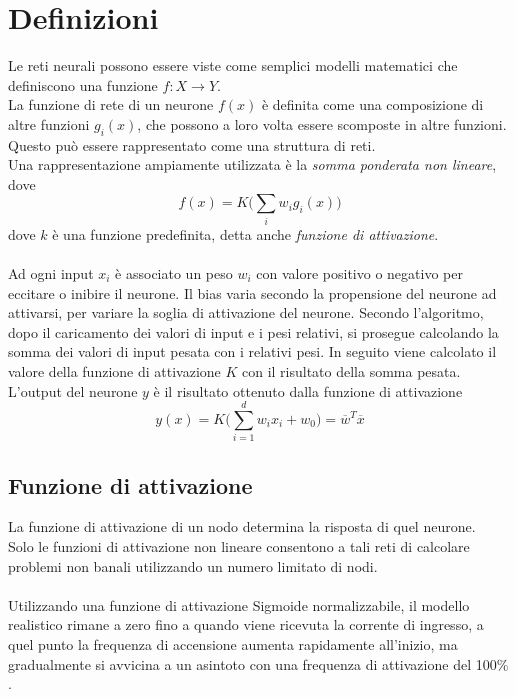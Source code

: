 \section{Definizioni}
\label{sec:def}
Le reti neurali possono essere viste come semplici modelli matematici che definiscono una funzione $f:X\rightarrow Y$. \\
La funzione di rete di un neurone $f(x)$ è definita come una composizione di altre funzioni $g_i(x)$, che possono a loro volta essere scomposte in altre funzioni. Questo può essere rappresentato come una struttura di reti.\\
Una rappresentazione ampiamente utilizzata è la \emph{somma ponderata non lineare}, dove 
\begin{equation}
f(x)=K \bigg( \sum_{i}w_ig_i(x)\bigg)
\end{equation}
dove $k$ è una funzione predefinita, detta anche \emph{funzione di attivazione}.
\\\\
Ad ogni input $x_i$ è associato un peso $w_i$ con valore positivo o negativo per eccitare o inibire il neurone. Il bias varia secondo la propensione del neurone ad attivarsi, per variare la soglia di attivazione del neurone.
Secondo l'algoritmo, dopo il caricamento dei valori di input e i pesi relativi, si prosegue calcolando la somma dei valori di input pesata con i relativi pesi. In seguito viene calcolato il valore della funzione di attivazione $K$ con il risultato della somma pesata.
L'output del neurone $y$ è il risultato ottenuto dalla funzione di attivazione
\begin{equation}
y(x)=K\bigg( \sum_{i=1}^{d}w_ix_i+w_0\bigg) = \overline{w}^T\overline{x}
\end{equation}

\subsection{Funzione di attivazione}
\label{subsec:fattivazione}
La funzione di attivazione di un nodo determina la risposta di quel neurone.\\
Solo le funzioni di attivazione non lineare consentono a tali reti di calcolare problemi non banali utilizzando un  numero limitato di nodi.\\\\
Utilizzando una funzione di attivazione Sigmoide normalizzabile, il modello realistico rimane a zero fino a quando viene ricevuta la corrente di ingresso, a quel punto la frequenza di accensione aumenta rapidamente all'inizio, ma gradualmente si avvicina a un asintoto con una frequenza di attivazione del 100\% \cite{han1995influence}.


